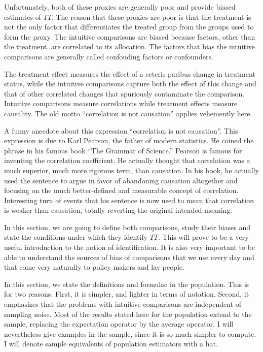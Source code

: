 \documentclass[]{book}
\theoremstyle{definition}
\theoremstyle{definition}
\theoremstyle{definition}
\theoremstyle{remark}
\let\BeginKnitrBlock\begin \let\EndKnitrBlock\end
\begin{document}
Unfortunately, both of these proxies are generally poor and provide
biased estimates of \(TT\). The reason that these proxies are poor is
that the treatment is not the only factor that differentiates the
treated group from the groups used to form the proxy. The intuitive
comparisons are biased because factors, other than the treatment, are
correlated to its allocation. The factors that bias the intuitive
comparisons are generally called confouding factors or confounders.

The treatment effect measures the effect of a ceteris paribus change in
treatment status, while the intuitive comparisons capture both the
effect of this change and that of other correlated changes that
spuriously contaminate the comparison. Intuitive comparisons measure
correlations while treatment effects measure causality. The old motto
``correlation is not causation'' applies vehemently here.

\BeginKnitrBlock{remark}
\iffalse{} {Remark. } \fi{}A funny anecdote about this expression
``correlation is not causation''. This expression is due to Karl
Pearson, the father of modern statistics. He coined the phrase in his
famous book ``The Grammar of Science.'' Pearson is famous for inventing
the correlation coefficient. He actually thought that correlation was a
much superior, much more rigorous term, than causation. In his book, he
actually used the sentence to argue in favor of abandoning causation
altogether and focusing on the much better-defined and measurable
concept of correlation. Interesting turn of events that his sentence is
now used to mean that correlation is weaker than causation, totally
reverting the original intended meaning.
\EndKnitrBlock{remark}

In this section, we are going to define both comparisons, study their
biases and state the conditions under which they identify \(TT\). This
will prove to be a very useful introduction to the notion of
identification. It is also very important to be able to understand the
sources of bias of comparisons that we use every day and that come very
naturally to policy makers and lay people.

\BeginKnitrBlock{remark}
\iffalse{} {Remark. } \fi{}In this section, we state the definitions and
formulae in the population. This is for two reasons. First, it is
simpler, and lighter in terms of notation. Second, it emphasizes that
the problems with intuitive comparisons are independent of sampling
noise. Most of the results stated here for the population extend to the
sample, replacing the expectation operator by the average operator. I
will nevertheless give examples in the sample, since it is so much
simpler to compute. I will denote sample equivalents of population
estimators with a hat.
\EndKnitrBlock{remark}
\end{document}
